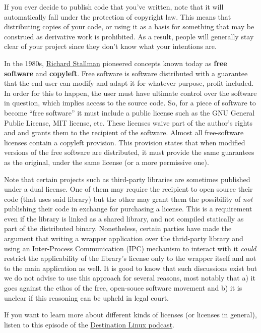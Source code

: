 If you ever decide to publish code that you've written, note that it will
automatically fall under the protection of copyright law. This means that
distributing copies of your code, or using it as a basis for something that may
be construed as derivative work is prohibited. As a result, people will
generally stay clear of your project since they don't know what your intentions
are.

In the 1980s, \href{https://www.youtube.com/watch?v=jUibaPTXSHk}{Richard
Stallman} pioneered concepts known today as \textbf{free software} and
\textbf{copyleft}. Free software is software distributed with a guarantee that
the end user can modify and adapt it for whatever purpose, profit included. In
order for this to happen, the user must have ultimate control over the software
in question, which implies access to the source code. So, for a piece of
software to become “free software” it must include a public license such as the
GNU General Public License, MIT license, etc. These licenses waive part of the
author's rights and and grants them to the recipient of the software. Almost all
free-software licenses contain a copyleft provision. This provision states that
when modified versions of the free software are distributed, it must provide
the same guarantees as the original, under the same license (or a more
permissive one).

Note that certain projects such as third-party libraries are sometimes published
under a dual license. One of them may require the recipient to open source their
code (that uses said library) but the other may grant them the possibility of
\textit{not} publishing their code in exchange for purchasing a license. This is
a requirement even if the library is linked as a shared library, and not
compiled statically as part of the distributed binary. Nonetheless, certain
parties have made the argument that writing a wrapper application over the
thrid-party library and using an Inter-Process Communication (IPC) mechanism
to interact with it \textit{could} restrict the applicability of the library's
license only to the wrapper itself and not to the main application as well.
It is good to know that such discussions exist but we do not advise to use this
approach for several reasons, most notably that a) it goes against the ethos of
the free, open-souce software movement and b) it is unclear if this reasoning
can be upheld in legal court.

If you want to learn more about different kinds of licenses (or licenses in
general), listen to this episode of the
\href{https://www.youtube.com/watch?v=dsm1SKqVsTQ&t=406s}{Destination Linux
podcast}.
